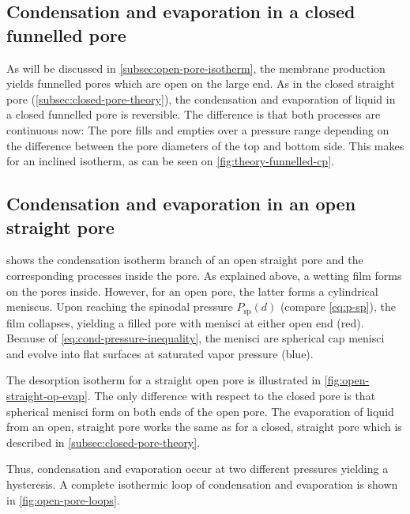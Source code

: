 \documentclass[../thesis.tex]{subfiles}
\begin{document}
      \subsection{Condensation and evaporation in a closed funnelled pore}
      \label{subsec:closed-funnelled-pore-theory}

        As will be discussed in \cref{subsec:open-pore-isotherm}, the membrane production yields funnelled pores which are open on the large end. As in the closed straight pore (\cref{subsec:closed-pore-theory}), the condensation and evaporation of liquid in a closed funnelled pore is reversible. The difference is that both processes are continuous now: The pore fills and empties over a pressure range depending on the difference between the pore diameters of the top and bottom side. This makes for an inclined isotherm, as can be seen on \cref{fig:theory-funnelled-cp}.

              
              
              

      \subsection{Condensation and evaporation in an open straight pore}
      \label{subsec:open-pore-theory}

         shows the condensation isotherm branch of an open straight pore and the corresponding processes inside the pore. As explained above, a wetting film forms on the pores inside. However, for an open pore, the latter forms a cylindrical meniscus. Upon reaching the spinodal pressure $P_\mathrm{sp}(d)$ (compare \cref{eq:p-sp}), the film collapses, yielding a filled pore with menisci at either open end (red). Because of \cref{eq:cond-pressure-inequality}, the menisci are spherical cap menisci and evolve into flat surfaces at saturated vapor pressure (blue).
        \medskip

        The desorption isotherm for a straight open pore is illustrated in \cref{fig:open-straight-op-evap}. The only difference with respect to the closed pore is that spherical menisci form on both ends of the open pore. The evaporation of liquid from an open, straight pore works the same as for a closed, straight pore which is described in \cref{subsec:closed-pore-theory}.

        Thus, condensation and evaporation occur at two different pressures yielding a hysteresis. A complete isothermic loop of condensation and evaporation is shown in \cref{fig:open-pore-loops}.
\end{document}
